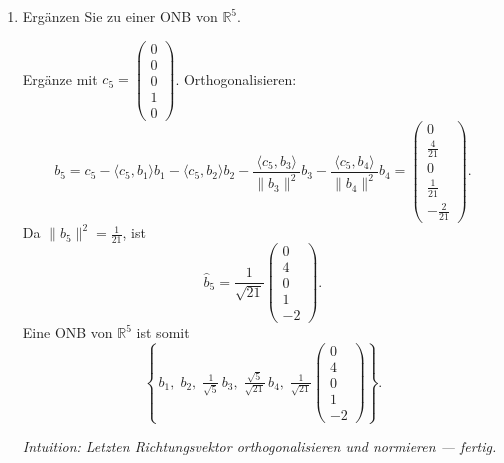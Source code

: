 \documentclass[11pt, a4paper]{article}
\begin{document}
\begin{enumerate}
  \item Ergänzen Sie zu einer ONB von $\mathbb{R}^5$.
  \begin{framed}
  Ergänze mit $c_5=\begin{pmatrix}0\\0\\0\\1\\0\end{pmatrix}$. Orthogonalisieren:
  \[
  b_5=c_5-\langle c_5,b_1\rangle b_1-\langle c_5,b_2\rangle b_2
      -\frac{\langle c_5,b_3\rangle}{\|b_3\|^2}b_3
      -\frac{\langle c_5,b_4\rangle}{\|b_4\|^2}b_4
      =\begin{pmatrix}0\\\tfrac{4}{21}\\0\\\tfrac{1}{21}\\-\tfrac{2}{21}\end{pmatrix}.
  \]
  Da $\|b_5\|^2=\tfrac{1}{21}$, ist
  \[
   \widehat b_5=\frac{1}{\sqrt{21}}\begin{pmatrix}0\\4\\0\\1\\-2\end{pmatrix}.
  \]
  Eine ONB von $\mathbb{R}^5$ ist somit
  \[
  \left\{\, b_{1},\; b_{2},\; \tfrac{1}{\sqrt5}\,b_{3},\;
  \tfrac{\sqrt5}{\sqrt{21}}\,b_{4},\;
  \tfrac{1}{\sqrt{21}}\begin{pmatrix}0\\4\\0\\1\\-2\end{pmatrix}\right\}.
  \]

  \medskip\noindent\textit{Intuition: Letzten Richtungsvektor orthogonalisieren und normieren — fertig.}
  \end{framed}
\end{enumerate}
\end{document}

